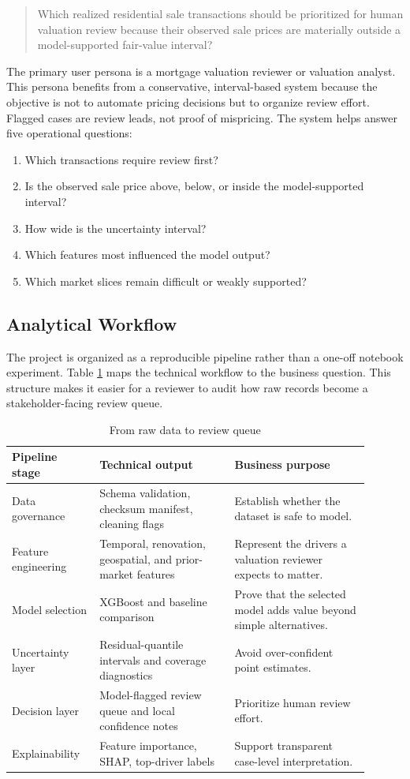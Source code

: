 \documentclass[12pt,a4paper]{article}
\begin{document}
\begin{quote}
Which realized residential sale transactions should be prioritized for human valuation review because their observed sale prices are materially outside a model-supported fair-value interval?
\end{quote}

The primary user persona is a mortgage valuation reviewer or valuation analyst. This persona benefits from a conservative, interval-based system because the objective is not to automate pricing decisions but to organize review effort. Flagged cases are review leads, not proof of mispricing. The system helps answer five operational questions:
\begin{enumerate}
    \item Which transactions require review first?
    \item Is the observed sale price above, below, or inside the model-supported interval?
    \item How wide is the uncertainty interval?
    \item Which features most influenced the model output?
    \item Which market slices remain difficult or weakly supported?
\end{enumerate}

\subsection{Analytical Workflow}
The project is organized as a reproducible pipeline rather than a one-off notebook experiment. Table \ref{tab:workflow_map} maps the technical workflow to the business question. This structure makes it easier for a reviewer to audit how raw records become a stakeholder-facing review queue.

\begin{table}[H]
\centering
\caption{From raw data to review queue}
\label{tab:workflow_map}
\begin{tabular}{p{0.22\linewidth}p{0.34\linewidth}p{0.34\linewidth}}
\toprule
\textbf{Pipeline stage} & \textbf{Technical output} & \textbf{Business purpose}\\
\midrule
Data governance & Schema validation, checksum manifest, cleaning flags & Establish whether the dataset is safe to model.\\
Feature engineering & Temporal, renovation, geospatial, and prior-market features & Represent the drivers a valuation reviewer expects to matter.\\
Model selection & XGBoost and baseline comparison & Prove that the selected model adds value beyond simple alternatives.\\
Uncertainty layer & Residual-quantile intervals and coverage diagnostics & Avoid over-confident point estimates.\\
Decision layer & Model-flagged review queue and local confidence notes & Prioritize human review effort.\\
Explainability & Feature importance, SHAP, top-driver labels & Support transparent case-level interpretation.\\
\bottomrule
\end{tabular}
\end{table}
\end{document}
